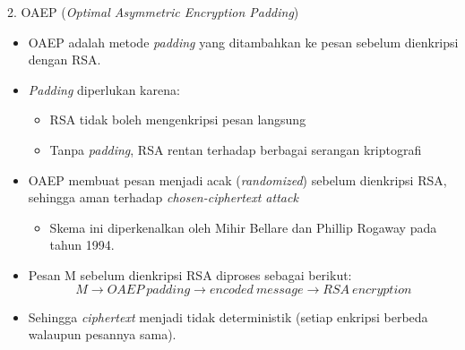 \documentclass{article}
\begin{document}

2. OAEP (\textit{Optimal Asymmetric Encryption Padding})
\begin{itemize}
    \item OAEP adalah metode \textit{padding} yang ditambahkan ke pesan sebelum dienkripsi dengan RSA.
    \item \textit{Padding} diperlukan karena:
    \begin{itemize}
        \item RSA tidak boleh mengenkripsi pesan langsung
        \item Tanpa \textit{padding}, RSA rentan terhadap berbagai serangan kriptografi
    \end{itemize}
    \item OAEP membuat pesan menjadi acak (\textit{randomized}) sebelum dienkripsi RSA, sehingga aman terhadap \textit{chosen-ciphertext attack}
    \begin{itemize}
        \item Skema ini diperkenalkan oleh Mihir Bellare dan Phillip Rogaway pada tahun 1994.
    \end{itemize}
    \item Pesan M sebelum dienkripsi RSA diproses sebagai berikut:
    \[ M \rightarrow OAEP\ padding \rightarrow encoded\ message \rightarrow RSA\ encryption \]
    \item Sehingga \textit{ciphertext} menjadi tidak deterministik (setiap enkripsi berbeda walaupun pesannya sama).
\end{itemize}
\end{document}
